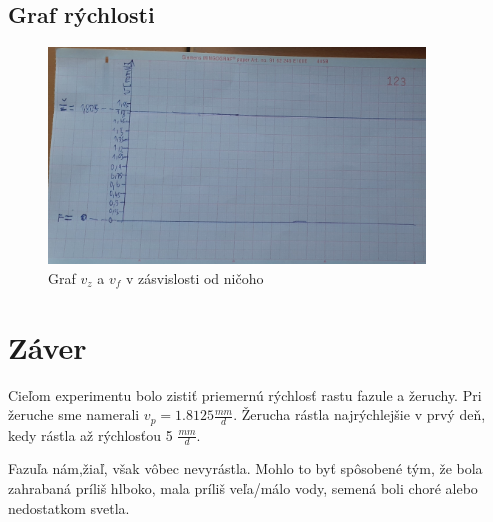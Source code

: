 \documentclass{article}
\begin{document}
\subsection{Graf rýchlosti}
\begin{figure}[h!]
		\includegraphics[width=10cm]{graf2.jpeg}
	\caption{Graf $v_z$ a $v_f$ v zásvislosti od ničoho}
\end{figure}

\section{Záver}
Cieľom experimentu bolo zistiť priemernú rýchlosť rastu fazule a žeruchy.
Pri žeruche sme namerali $v_p=1.8125 \frac{mm}{d}$.
Žerucha rástla najrýchlejšie v prvý deň, kedy rástla až rýchlosťou 5 $\frac{mm}{d}$.

Fazuľa nám,žiaľ, však vôbec nevyrástla.
Mohlo to byť spôsobené tým, že bola zahrabaná príliš hlboko, mala príliš veľa/málo vody, semená boli choré alebo nedostatkom svetla.


	
\end{document}
